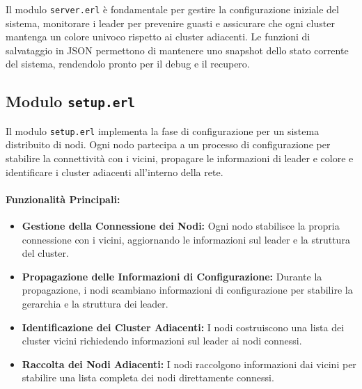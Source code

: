 \documentclass[12pt, a4paper]{report}
\begin{document}
\noindent
Il modulo \texttt{server.erl} è fondamentale per gestire la configurazione iniziale del sistema, monitorare i leader per prevenire guasti e assicurare che ogni cluster mantenga un colore univoco rispetto ai cluster adiacenti. Le funzioni di salvataggio in JSON permettono di mantenere uno snapshot dello stato corrente del sistema, rendendolo pronto per il debug e il recupero.

\subsection{Modulo \texttt{setup.erl}}

Il modulo \texttt{setup.erl} implementa la fase di configurazione per un sistema distribuito di nodi. Ogni nodo partecipa a un processo di configurazione per stabilire la connettività con i vicini, propagare le informazioni di leader e colore e identificare i cluster adiacenti all'interno della rete.

\paragraph{Funzionalità Principali:}
\begin{itemize}
    \item \textbf{Gestione della Connessione dei Nodi:} Ogni nodo stabilisce la propria connessione con i vicini, aggiornando le informazioni sul leader e la struttura del cluster.
    \item \textbf{Propagazione delle Informazioni di Configurazione:} Durante la propagazione, i nodi scambiano informazioni di configurazione per stabilire la gerarchia e la struttura dei leader.
    \item \textbf{Identificazione dei Cluster Adiacenti:} I nodi costruiscono una lista dei cluster vicini richiedendo informazioni sul leader ai nodi connessi.
    \item \textbf{Raccolta dei Nodi Adiacenti:} I nodi raccolgono informazioni dai vicini per stabilire una lista completa dei nodi direttamente connessi.
\end{itemize}
\end{document}
